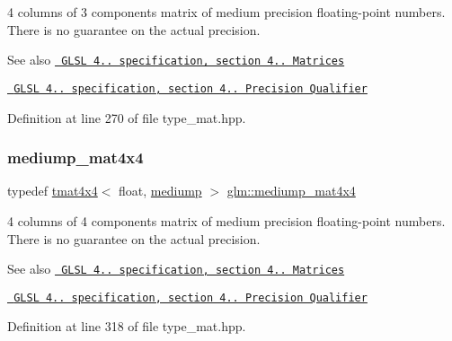 4 columns of 3 components matrix of medium precision floating-\/point numbers. There is no guarantee on the actual precision.

\begin{DoxySeeAlso}{See also}
\href{http://www.opengl.org/registry/doc/GLSLangSpec.4.20.8.pdf}{\texttt{ G\+L\+SL 4.. specification, section 4.. Matrices}} 

\href{http://www.opengl.org/registry/doc/GLSLangSpec.4.20.8.pdf}{\texttt{ G\+L\+SL 4.. specification, section 4.. Precision Qualifier}} 
\end{DoxySeeAlso}


Definition at line 270 of file type\+\_\+mat.\+hpp.

\mbox{\label{group__core__precision_gaad45864262bb2cf923667fde779a0058}} 
\subsubsection{\texorpdfstring{mediump\_mat4x4}{mediump\_mat4x4}}
{\footnotesize\ttfamily typedef \mbox{\hyperlink{structglm_1_1tmat4x4}{tmat4x4}}$<$ float, \mbox{\hyperlink{namespaceglm_a0f04f086094c747d227af4425893f545a6416f3ea0c9025fb21ed50c4d6620482}{mediump}} $>$ \mbox{\hyperlink{group__core__precision_gaad45864262bb2cf923667fde779a0058}{glm\+::mediump\+\_\+mat4x4}}}

4 columns of 4 components matrix of medium precision floating-\/point numbers. There is no guarantee on the actual precision.

\begin{DoxySeeAlso}{See also}
\href{http://www.opengl.org/registry/doc/GLSLangSpec.4.20.8.pdf}{\texttt{ G\+L\+SL 4.. specification, section 4.. Matrices}} 

\href{http://www.opengl.org/registry/doc/GLSLangSpec.4.20.8.pdf}{\texttt{ G\+L\+SL 4.. specification, section 4.. Precision Qualifier}} 
\end{DoxySeeAlso}


Definition at line 318 of file type\+\_\+mat.\+hpp.

\mbox{\label{group__core__precision_ga08ae38ad78ade3539fdd1d25052b8c51}} 

